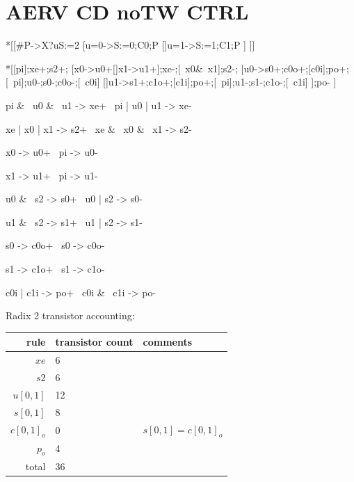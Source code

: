 \documentclass{article}
\begin{document}
\section{AERV CD noTW CTRL \label{sec:AERV_CD_noTW_CTRL}}

\begin{csp}
*[[#{P}->X?u\*S:=2
    [u=0->S:=0;C0;P
    []u=1->S:=1;C1;P
    ]
 ]]
\end{csp}

\begin{hse}
*[[pi];xe+;s2+;
  [x0->u0+[]x1->u1+];xe-;[~x0&~x1];s2-;
  [u0->s0+;c0o+;[c0i];po+;[~pi];u0-;s0-;c0o-;[~c0i]
  []u1->s1+;c1o+;[c1i];po+;[~pi];u1-;s1-;c1o-;[~c1i]
  ];po-
 ]
\end{hse}

\begin{prs2}
pi & ~u0 & ~u1 -> xe+
~pi | u0 | u1 -> xe-
\end{prs2}

\begin{prs2}
xe | x0 | x1 -> s2+
~xe & ~x0 & ~x1 -> s2-
\end{prs2}

\begin{prs2}
x0 -> u0+
~pi -> u0-

x1 -> u1+
~pi -> u1-
\end{prs2}

\begin{prs2}
u0 & ~s2 -> s0+
~u0 | s2 -> s0-

u1 & ~s2 -> s1+
~u1 | s2 -> s1-
\end{prs2}

\begin{prs2}
s0 -> c0o+
~s0 -> c0o-

s1 -> c1o+
~s1 -> c1o-
\end{prs2}

\begin{prs2}
c0i | c1i -> po+
~c0i & ~c1i -> po-
\end{prs2}

\noindent
Radix 2 transistor accounting:

\begin{center}
    \begin{tabular}{|r|l|l|}
    \hline
    rule & transistor count & comments \\ \hline
    $xe$ & 6 & \\ \hline
    $s2$ & 6 & \\ \hline
    $u[0,1]$ & 12 & \\ \hline
    $s[0,1]$ & 8 & \\ \hline
    $c[0,1]_o$ & 0 & $s[0,1]=c[0,1]_o$ \\ \hline
    $p_o$ & 4 & \\ \hline
    \hline total & 36 & \\ \hline
    \end{tabular}
\end{center}
\end{document}
